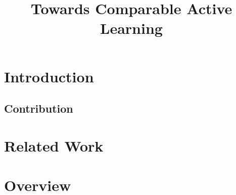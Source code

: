 \documentclass[]{article}
\title{Towards Comparable Active Learning}
\begin{document}
\maketitle

\section{Introduction}


\subsection{Contribution}

\section{Related Work}

\section{Overview}
\end{document}
